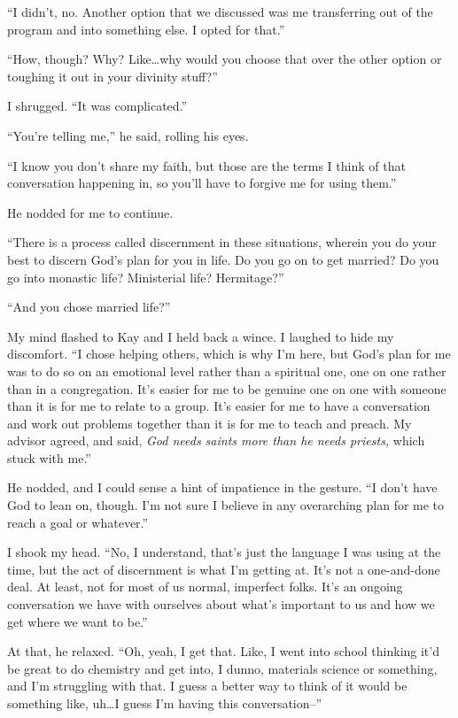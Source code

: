``I didn't, no. Another option that we discussed was me transferring out of the program and into something else. I opted for that.''

``How, though? Why? Like\ldots why would you choose that over the other option or toughing it out in your divinity stuff?''

I shrugged. ``It was complicated.''

``You're telling me,'' he said, rolling his eyes.

``I know you don't share my faith, but those are the terms I think of that conversation happening in, so you'll have to forgive me for using them.''

He nodded for me to continue.

``There is a process called discernment in these situations, wherein you do your best to discern God's plan for you in life. Do you go on to get married? Do you go into monastic life? Ministerial life? Hermitage?''

``And you chose married life?''

My mind flashed to Kay and I held back a wince. I laughed to hide my discomfort. ``I chose helping others, which is why I'm here, but God's plan for me was to do so on an emotional level rather than a spiritual one, one on one rather than in a congregation. It's easier for me to be genuine one on one with someone than it is for me to relate to a group. It's easier for me to have a conversation and work out problems together than it is for me to teach and preach. My advisor agreed, and said, \emph{God needs saints more than he needs priests,} which stuck with me.''

He nodded, and I could sense a hint of impatience in the gesture. ``I don't have God to lean on, though. I'm not sure I believe in any overarching plan for me to reach a goal or whatever.''

I shook my head. ``No, I understand, that's just the language I was using at the time, but the act of discernment is what I'm getting at. It's not a one-and-done deal. At least, not for most of us normal, imperfect folks. It's an ongoing conversation we have with ourselves about what's important to us and how we get where we want to be.''

At that, he relaxed. ``Oh, yeah, I get that. Like, I went into school thinking it'd be great to do chemistry and get into, I dunno, materials science or something, and I'm struggling with that. I guess a better way to think of it would be something like, uh\ldots I guess I'm having this conversation--''

